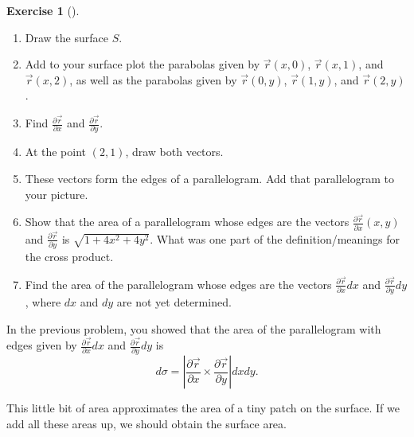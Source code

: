 \documentclass[10pt,]{book}
\theoremstyle{plain}
\theoremstyle{definition}
\theoremstyle{definition}
\theoremstyle{definition}
\theoremstyle{definition}
\newtheorem{exploration}[project]{Exercise}
\theoremstyle{definition}
\numberwithin{equation}{section}
\newcommand{\ds}{\displaystyle}
\begin{document}
\begin{exploration}[]\label{exploration-276}
\leavevmode%
\begin{enumerate}[font=\bfseries,label=(\alph*),ref=\alph*]
\item\label{task-742} Draw the surface \(S\).%
\item\label{task-743} Add to your surface plot the parabolas given by \(\vec r(x,0)\), \(\vec r(x,1)\), and \(\vec r(x,2)\), as well as the parabolas given by \(\vec r(0,y)\), \(\vec r(1,y)\), and \(\vec r(2,y)\).%
\item\label{task-744} Find \(\ds \frac{\partial \vec r}{\partial x}\) and \(\ds\frac{\partial \vec r}{\partial y}\).%
\item\label{task-745} At the point \((2,1)\), draw both vectors.%
\item\label{task-746} These vectors form the edges of a parallelogram. Add that parallelogram to your picture.%
\item\label{task-747} Show that the area of a parallelogram whose edges are the vectors \(\ds\frac{\partial \vec r}{\partial x}(x,y)\) and \(\ds\frac{\partial \vec r}{\partial y}\) is \(\sqrt{1+4x^2+4y^2}\). What was one part of the definition/meanings for the cross product.%
%
\item\label{task-748} Find the area of the parallelogram whose edges are the vectors \(\ds\frac{\partial \vec r}{\partial x}dx\) and \(\ds\frac{\partial \vec r}{\partial y}dy\), where \(dx\) and \(dy\) are not yet determined.%
\end{enumerate}
\end{exploration}
In the previous problem, you showed that the area of the parallelogram with edges given by \(\frac{\partial \vec r}{\partial x}dx\) and \(\frac{\partial \vec r}{\partial y}dy\) is%
\begin{equation*}
d\sigma =\left |\frac{\partial \vec r}{\partial x} \times \frac{\partial \vec r}{\partial y}\right| dxdy.
\end{equation*}
%
\par
This little bit of area approximates the area of a tiny patch on the surface. If we add all these areas up, we should obtain the surface area.%
\end{document}
